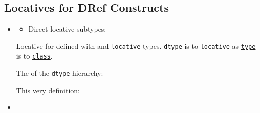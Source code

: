 \subsection{Locatives for DRef
Constructs}\label{locatives-for-dref-constructs}

\label{x-28DREF-3A-40DREF-LOCATIVES-20MGL-PAX-3ASECTION-29}

\begin{itemize}
\item
  \label{x-28DREF-3ADTYPE-20MGL-PAX-3ALOCATIVE-29}

  \begin{itemize}
  \tightlist
  \item
    Direct locative subtypes:
  \end{itemize}

  Locative for
  defined with
  and \texttt{locative} types. \texttt{dtype} is to \texttt{locative} as
  \href{http://www.lispworks.com/documentation/HyperSpec/Body/d_type.htm}{\texttt{type}}
  is to
  \href{http://www.lispworks.com/documentation/HyperSpec/Body/t_class.htm}{\texttt{class}}.

  The  of the
  \texttt{dtype} hierarchy:

\begin{Shaded}
\begin{Highlighting}[]
 \NormalTok{)}
\end{Highlighting}
\end{Shaded}

  This very definition:

\begin{Shaded}
\begin{Highlighting}[]
 \NormalTok{)}
\end{Highlighting}
\end{Shaded}
\item
  \label{x-28MGL-PAX-3ALOCATIVE-20MGL-PAX-3ALOCATIVE-29}


\end{itemize}
